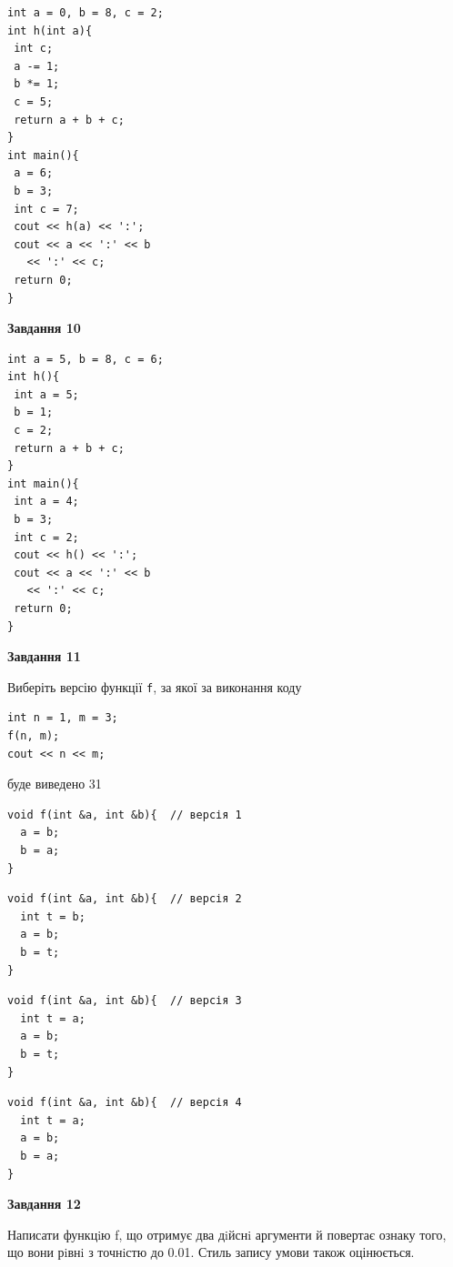\documentclass[12pt, ukrainian]{article}
\def\code#1{\Verb!#1!}
\begin{document}
{\begin {large}
\begin{minipage}[t]{7.0cm}
\begin{verbatim}
int a = 0, b = 8, c = 2;
int h(int a){
 int c;
 a -= 1;
 b *= 1;
 c = 5;
 return a + b + c;
}
int main(){
 a = 6;
 b = 3;
 int c = 7;
 cout << h(a) << ':';
 cout << a << ':' << b 
   << ':' << c;
 return 0;
}
\end{verbatim}



\begin{center}
\textbf{Завдання 10}
\end{center}
\vspace{-8mm}

\begin{verbatim}
int a = 5, b = 8, c = 6;
int h(){
 int a = 5;
 b = 1;
 c = 2;
 return a + b + c;
}
int main(){
 int a = 4;
 b = 3;
 int c = 2;
 cout << h() << ':';
 cout << a << ':' << b 
   << ':' << c;
 return 0;
}
\end{verbatim}

\end{minipage}
\vline \hspace{1mm}
\begin{minipage}[t]{11.0cm}

\begin{center}
\textbf{Завдання 11}
\end{center}
Виберіть версію функції \code{f}, за якої за виконання коду
\begin{verbatim}
int n = 1, m = 3;
f(n, m);
cout << n << m;
\end{verbatim}

буде виведено 31

\begin{verbatim}
void f(int &a, int &b){  // версія 1
  a = b;
  b = a;
}
\end{verbatim}

\vspace{-8mm}\begin{verbatim}
void f(int &a, int &b){  // версія 2
  int t = b;
  a = b;
  b = t;
}
\end{verbatim}

\vspace{-8mm}\begin{verbatim}
void f(int &a, int &b){  // версія 3
  int t = a;
  a = b;
  b = t;
}
\end{verbatim}

\vspace{-8mm}\begin{verbatim}
void f(int &a, int &b){  // версія 4
  int t = a;
  a = b;
  b = a;
}
\end{verbatim}



\begin{center}
\textbf{Завдання 12}
\end{center}

Написати функцiю f, що отримує два дiйснi аргументи й повертає ознаку того, що вони рiвнi з точнiстю до 0.01. Стиль запису умови також оцінюється.\par

\end{minipage}

\end {large}}
\newpage
\end{document}
